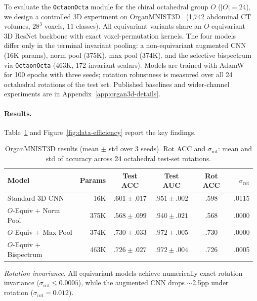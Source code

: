 \documentclass{article}
\begin{document}
To evaluate the \texttt{OctaonOcta} module for the chiral octahedral group
$O$ ($|O|=24$), we design a controlled 3D experiment on
OrganMNIST3D~\citep{medmnistv2} (1{,}742 abdominal CT volumes, $28^3$
voxels, 11 classes). All equivariant variants share an $O$-equivariant 3D
ResNet backbone with exact voxel-permutation kernels. The four models differ
only in the terminal invariant pooling: a non-equivariant augmented CNN
(16K params), norm pool (375K), max pool (374K), and the selective
bispectrum via \texttt{OctaonOcta} (463K, 172 invariant scalars). Models
are trained with AdamW~\citep{loshchilov2019adamw} for 100 epochs with
three seeds; rotation robustness is measured over all 24 octahedral
rotations of the test set. Published baselines and wider-channel experiments
are in Appendix~\ref{app:organ3d-details}.

\paragraph{Results.}
Table~\ref{tab:organ3d-results} and Figure~\ref{fig:data-efficiency} report
the key findings.

\begin{table}[t]
  \caption{OrganMNIST3D results (mean $\pm$ std over 3 seeds). Rot ACC and
    $\sigma_{\mathrm{rot}}$: mean and std of accuracy across 24 octahedral
    test-set rotations.}
  \label{tab:organ3d-results}
  \centering
  \small
  \begin{tabular}{lrcccr}
    \toprule
    Model & Params & Test ACC & Test AUC & Rot ACC & $\sigma_{\mathrm{rot}}$ \\
    \midrule
    Standard 3D CNN          & 16K  & $.601 \pm .017$ & $.951 \pm .002$ & .598 & .0115 \\
    $O$-Equiv + Norm Pool    & 375K & $.568 \pm .099$ & $.940 \pm .021$ & .568 & .0000 \\
    $O$-Equiv + Max Pool     & 374K & $.730 \pm .033$ & $.972 \pm .005$ & .730 & .0000 \\
    $O$-Equiv + Bispectrum   & 463K & $.726 \pm .027$ & $.972 \pm .004$ & .726 & .0005 \\
    \bottomrule
  \end{tabular}
\end{table}

\emph{Rotation invariance.}
All equivariant models achieve numerically exact rotation invariance
($\sigma_{\mathrm{rot}} \leq 0.0005$), while the augmented CNN drops
${\sim}$2.5pp under rotation ($\sigma_{\mathrm{rot}} = 0.012$).
\end{document}
